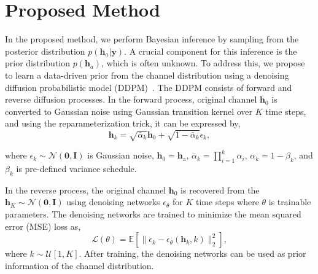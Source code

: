 \documentclass[lettersize,journal]{IEEEtran}
\begin{document}
\section{Proposed Method}

In the proposed method, we perform Bayesian inference by sampling from the posterior distribution $p(\mathbf{h}_{a}|\mathbf{y})$. A crucial component for this inference is the prior distribution $p(\mathbf{h}_{a})$, which is often unknown. To address this, we propose to learn a data-driven prior from the channel distribution using a denoising diffusion probabilistic model (DDPM)~\cite{hoDenoisingDiffusionProbabilistic2020}. The DDPM consists of forward and reverse diffusion processes. In the forward process, original channel $\mathbf{h}_{0}$ is converted to Gaussian noise using Gaussian transition kernel over $K$ time steps, and using the reparameterization trick, it can be expressed by,
\begin{equation}
\mathbf{h}_{k} = \sqrt{ \bar{\alpha}_{k} }\mathbf{h}_{0} + \sqrt{ 1-\bar{\alpha}_{k} }\epsilon_{k},
\end{equation}

where $\epsilon_{k}\sim\mathcal{N}(\mathbf{0},\mathbf{I})$ is Gaussian noise, $\mathbf{h}_{0} = \mathbf{h}_{\text{a}}$, $\bar{\alpha}_{k}=\prod_{i=1}^{k}\alpha_{i}$, $\alpha_{k}=1-\beta_{k}$, and $\beta_{k}$ is pre-defined variance schedule.

In the reverse process, the original channel $\mathbf{h}_{0}$ is recovered from the $\mathbf{h}_{K}\sim\mathcal{N}(\mathbf{0},\mathbf{I})$ using denoising networks $\epsilon_{\theta}$ for $K$ time steps where $\theta$ is trainable parameters. The denoising networks are trained to minimize the mean squared error (MSE) loss as,
\begin{equation}
\mathcal{L}(\theta) = \mathbb{E}[\|\epsilon_{k} - \epsilon_{\theta}(\mathbf{h}_{k},k)\|_{2}^{2}],
\end{equation}
where $k\sim\mathcal{U}[1,K]$. After training, the denoising networks can be used as prior information of the channel distribution.
\end{document}
